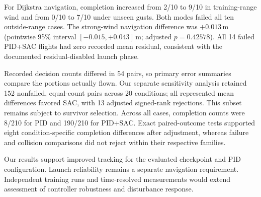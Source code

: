For Dijkstra navigation, completion increased from 2/10 to 9/10 in training-range wind and from 0/10 to 7/10 under unseen gusts. Both modes failed all ten outside-range cases. The strong-wind navigation difference was $+0.013$\,m (pointwise 95\% interval $[-0.015,+0.043]$\,m; adjusted $p=0.42578$). All 14 failed PID+SAC flights had zero recorded mean residual, consistent with the documented residual-disabled launch phase.

Recorded decision counts differed in 54 pairs, so primary error summaries compare the portions actually flown. Our separate sensitivity analysis retained 152 nonfailed, equal-count pairs across 20 conditions; all represented mean differences favored SAC, with 13 adjusted signed-rank rejections. This subset remains subject to survivor selection. Across all cases, completion counts were 8/210 for PID and 190/210 for PID+SAC. Exact paired-outcome tests supported eight condition-specific completion differences after adjustment, whereas failure and collision comparisons did not reject within their respective families.

Our results support improved tracking for the evaluated checkpoint and PID configuration. Launch reliability remains a separate navigation requirement. Independent training runs and time-resolved measurements would extend assessment of controller robustness and disturbance response.
